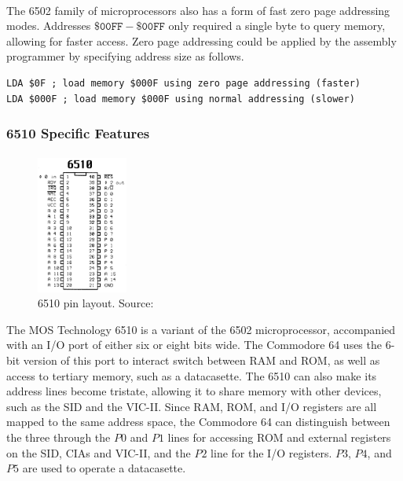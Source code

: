\documentclass{article}
\begin{document}
\paragraph{}
The 6502 family of microprocessors also has a form of fast zero page addressing modes. Addresses $\mathtt{\$00FF - \$00FF}$ only required a single byte to query memory, allowing for faster access. Zero page addressing could be applied by the assembly programmer by specifying address size as follows.
\begin{lstlisting}
LDA $0F ; load memory $000F using zero page addressing (faster)
LDA $000F ; load memory $000F using normal addressing (slower)
\end{lstlisting}

\subsubsection{6510 Specific Features}
\paragraph{}
\begin{figure}
\vspace{-20pt}
\begin{center}
\includegraphics[width=3cm]{6510}
\caption{6510 pin layout. Source: \cite{c64_tech_details}}
\end{center}
\end{figure}
The MOS Technology 6510 is a variant of the 6502 microprocessor, accompanied with an I/O port of either six or eight bits wide. The Commodore 64 uses the 6-bit version of this port to interact switch between RAM and ROM, as well as access to tertiary memory, such as a datacasette. The 6510 can also make its address lines become tristate, allowing it to share memory with other devices, such as the SID and the VIC-II. Since RAM, ROM, and I/O registers are all mapped to the same address space, the Commodore 64 can distinguish between the three through the $P0$ and $P1$ lines for accessing ROM and external registers on the SID, CIAs and VIC-II, and the $P2$ line for the I/O registers. $P3$, $P4$, and $P5$ are used to operate a datacasette.
\end{document}
